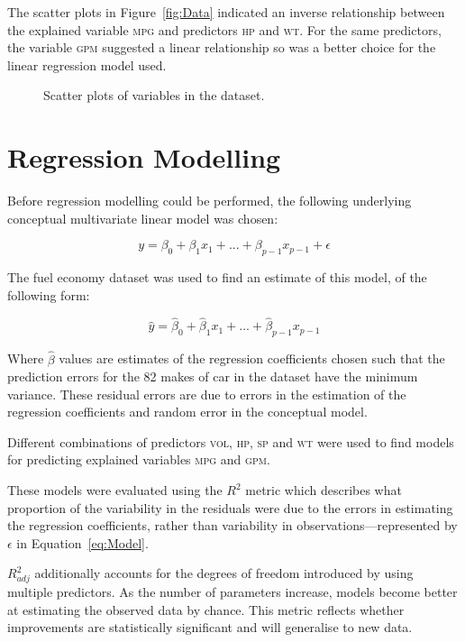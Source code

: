 \documentclass[a4paper,10pt,twocolumn]{article}
\newcommand{\MPG}{\textsc{mpg}\xspace}
\newcommand{\GPM}{\textsc{gpm}\xspace}
\newcommand{\VOL}{\textsc{vol}\xspace}
\newcommand{\HP}{\textsc{hp}\xspace}
\newcommand{\SP}{\textsc{sp}\xspace}
\newcommand{\WT}{\textsc{wt}\xspace}
\begin{document}
The scatter plots in Figure~\vref{fig:Data} indicated an inverse relationship 
between the explained variable \MPG and predictors \HP and \WT. For the same 
predictors, the variable \GPM suggested a linear relationship so was a 
better choice for the linear regression model used.

\begin{figure}[h]
    \centering
    \def\svgwidth{0.5\textwidth}
    
    \caption{Scatter plots of variables in the dataset.}
    \label{fig:Data}
\end{figure}

\section{Regression Modelling}

Before regression modelling could be performed, the following underlying 
conceptual multivariate linear model was chosen:

\begin{equation}
    y = \beta_0 + \beta_1 x_1 + ... + \beta_{p-1}x_{p-1} + \epsilon
    \label{eq:Model}
\end{equation}

The fuel economy dataset was used to find an estimate of this model, of the 
following form:

\begin{equation}
    \hat{y} = \hat{\beta}_0 + \hat{\beta}_1 x_1 + ... + \hat{\beta}_{p-1}x_{p-1}
    \label{eq:Estimate}
\end{equation}

Where $\hat{\beta}$ values are estimates of the regression coefficients chosen 
such that the prediction errors for the 82 makes of car in the dataset have the 
minimum variance. These residual errors are due to errors in the estimation of 
the regression coefficients and random error in the conceptual model.

Different combinations of predictors \VOL, \HP, \SP and \WT were used to find 
models for predicting explained variables \MPG and \GPM.

These models were evaluated using the $R^2$ metric which describes what  
proportion of the variability in the residuals were due to the errors in 
estimating the regression coefficients, rather than variability in 
observations---represented by $\epsilon$ in Equation~\vref{eq:Model}.

$R_{adj}^2$ additionally accounts for the degrees of freedom introduced by 
using multiple predictors. As the number of parameters increase, models become 
better at estimating the observed data by chance. This metric reflects whether 
improvements are statistically significant and will generalise to new data.
\end{document}
